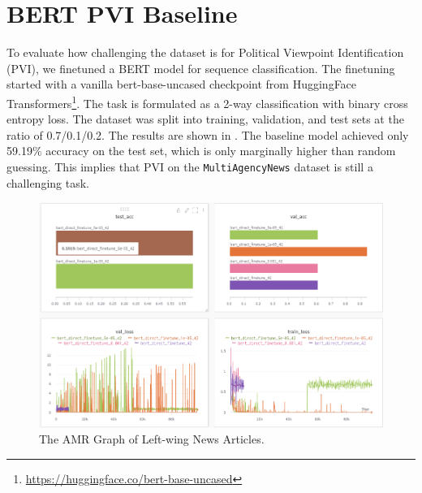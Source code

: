 \section{BERT PVI Baseline}
\label{empirical-bert-pvi}
To evaluate how challenging the dataset is for Political Viewpoint Identification (PVI), we finetuned a BERT model for sequence classification. The finetuning started with a vanilla bert-base-uncased checkpoint from HuggingFace Transformers\footnote{\url{https://huggingface.co/bert-base-uncased}}. The task is formulated as a 2-way classification with binary cross entropy loss. The dataset was split into training, validation, and test sets at the ratio of 0.7/0.1/0.2. The results are shown in . The baseline model achieved only 59.19\% accuracy on the test set, which is only marginally higher than random guessing. This implies that PVI on the \texttt{MultiAgencyNews} dataset is still a challenging task.

\begin{figure}[ht]
    \centering
    \includegraphics[width=\textwidth]{img/empirical-bert-baseline}
    \caption{The AMR Graph of Left-wing News Articles.}
    \label{fig:empirical-bert-baseline}
\end{figure}
